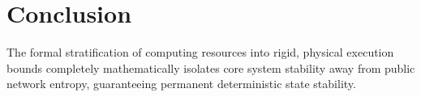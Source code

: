 \documentclass[12pt, a4paper]{article}
\theoremstyle{plain}
\theoremstyle{definition}
\begin{document}
\section{Conclusion}
The formal stratification of computing resources into rigid, physical execution bounds completely mathematically isolates core system stability away from public network entropy, guaranteeing permanent deterministic state stability.



\end{document}
